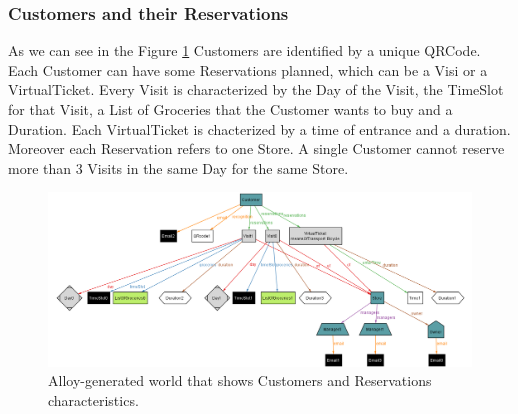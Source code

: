 \documentclass[a4paper, 10pt, oneside]{article}
\begin{document}
\subsubsection{Customers and their Reservations}
As we can see in the Figure \ref{alloy_customer} Customers are identified by a unique QRCode. Each Customer can have some Reservations planned, which can be a Visi or a VirtualTicket. Every Visit is characterized by the Day of the Visit, the TimeSlot for that Visit, a List of Groceries that the Customer wants to buy and a Duration.  Each VirtualTicket is chacterized by a time of entrance and a duration. Moreover each Reservation refers to one Store. A single Customer cannot reserve more than 3 Visits in the same Day for the same Store.
\begin{figure}[h!]
\centering
	\centering
  	\includegraphics[height=0.27\textheight, scale=0.3, keepaspectratio]{img/alloy/alloy_customer_reservations.png}
	\caption{Alloy-generated world that shows Customers and Reservations characteristics.}
 	\label{alloy_customer}
\end{figure}
\end{document}
